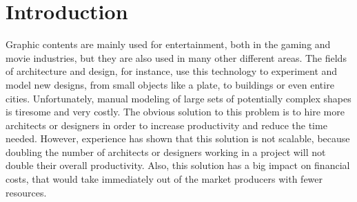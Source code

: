 
% 
% 

\section{Introduction}




Graphic contents are mainly used for entertainment, both in the gaming and movie industries, but they are also used in many other different areas. The fields of architecture and design, for instance, use this technology to experiment and model new designs, from small objects like a plate, to buildings or even entire cities. Unfortunately, manual modeling of large sets of potentially complex shapes is tiresome and very costly. 
The obvious solution to this problem is to hire more architects or designers in order to increase productivity and reduce the time needed. However, experience has shown that this solution is not scalable, because doubling the number of architects or designers working in a project will not double their overall productivity. Also, this solution has a big impact on financial costs, that would take immediately out of the market producers with fewer resources.

